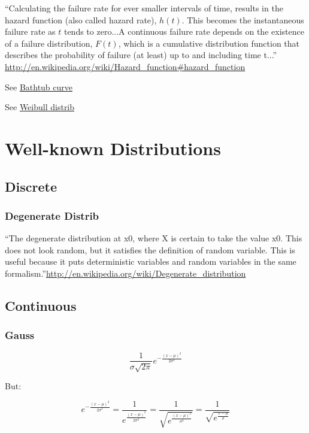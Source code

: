 \documentclass[reqno,12pt]{tufte-book}
\numberwithin{equation}{subsection}
\begin{document}
``Calculating the failure rate for ever smaller intervals of time,
results in the hazard function (also called hazard rate), $h(t)$. This
becomes the instantaneous failure rate as $t$ tends
to zero...A continuous failure rate depends on the existence of a
failure distribution, $F(t)$, which is a cumulative
distribution function that describes the probability of failure (at
least) up to and including time t...''
\url{http://en.wikipedia.org/wiki/Hazard_function#hazard_function}

See \href{http://en.wikipedia.org/wiki/Bathtub_curve}{Bathtub curve}

See \href{http://en.wikipedia.org/wiki/Weibull_chart}{Weibull distrib}

\chapter{Well-known Distributions}

\section{Discrete}

\subsection{Degenerate Distrib}

``The degenerate distribution at x0, where X is certain to take the
value x0. This does not look random, but it satisfies the definition
of random variable. This is useful because it puts deterministic
variables and random variables in the same
formalism.''\url{http://en.wikipedia.org/wiki/Degenerate_distribution}

\section{Continuous}
\subsection{Gauss}

\begin{equation}
  \frac{1}{\sigma\sqrt{2\pi}}e^{-\frac{(x-\mu)^2}{2\sigma^2}}
\end{equation}

But:

\begin{equation}
  e^{-\frac{(x-\mu)^2}{2\sigma^2}} = \frac{1}{e^\frac{(x-\mu)^2}{2\sigma^2}} =
  \frac{1}{\sqrt{e^{\frac{(x-\mu)^2}{\sigma^2}}}} =
  \frac{1}{\sqrt{e^{\frac{x-\mu}{\sigma}}}}
\end{equation}
\end{document}
